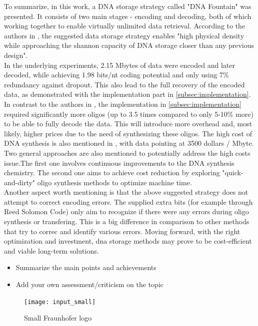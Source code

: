 \documentclass[12pt]%
{article}
\begin{document}
To summarize, in this work, a DNA storage strategy called "DNA Fountain" was presented. It consists of two main stages - encoding and decoding, both of which working together to enable virtually unlimited data retrieval. According to the authors in \cite{erlich2017dna}, the suggested data storage strategy enables "high physical density while approaching the shannon capacity of DNA storage closer than any previous design".\\ 
In the underlying experiments, 2.15 Mbytes of data were encoded and later decoded, while achieving 1.98 bits/nt coding potential and only using 7\% redundancy against dropout. This also lead to the full recovery of the encoded data, as demonstrated with the implementation part in \ref{subsec:implementation}. In contrast to the authors in \cite{erlich2017dna}, the implementation in \ref{subsec:implementation} required significantly more oligos (up to 3.5 times compared to only 5-10\% more) to be able to fully decode the data. This will introduce more overhead and, most likely, higher prices due to the need of  synthesizing these oligos. The high cost of DNA synthesis is also mentioned in \cite{erlich2017dna}, with data pointing at 3500 dollars / Mbyte. Two general approaches are also mentioned to potentially address the high costs issue.The first one involves continuous improvements to the DNA synthesis chemistry. The second one aims to achieve cost reduction by exploring "quick-and-dirty" oligo synthesis methods to optimize machine time. \\
Another aspect worth mentioning is that the above suggested strategy does not attempt to correct encoding errors. The supplied extra bits (for example through Reed Solomon Code) only aim to recognize if there were any errors during oligo synthesis or transfering. This is a big difference in comparison to other methods that try to correc and identify various errors. Moving forward, with the right optimization and investment, dna storage methods may prove to be cost-efficient and viable long-term solutions.
\begin{itemize}
\item Summarize the main points and achievements
\item Add your own assessment/criticism on the topic
\end{itemize}


\begin{figure}[h]
    \centering
    \texttt{[image: input\_small]}
    \caption{Small Fraunhofer logo}
    \label{fig:logo_short}
\end{figure}
\end{document}
